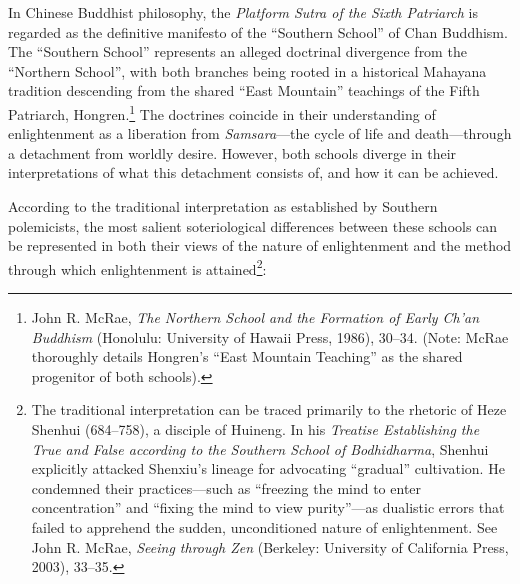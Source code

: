 In Chinese Buddhist philosophy, the \emph{Platform Sutra of the Sixth Patriarch} is regarded as the definitive manifesto of the ``Southern
School'' of Chan Buddhism. The ``Southern School'' represents an alleged
doctrinal divergence from the ``Northern School'', with both branches
being rooted in a historical Mahayana tradition descending from the
shared ``East Mountain'' teachings of the Fifth Patriarch, Hongren.\footnote{John R. McRae, \emph{The Northern School and the
  Formation of Early Ch'an Buddhism} (Honolulu: University of Hawaii
  Press, 1986), 30--34. (Note: McRae thoroughly details Hongren's ``East
  Mountain Teaching'' as the shared progenitor of both schools).} The doctrines coincide in their understanding of enlightenment as a
liberation from \emph{Samsara}---the cycle of life and death---through a detachment from worldly desire. However, both schools diverge in their
interpretations of what this detachment consists of, and how it can be achieved.

According to the traditional interpretation as established by Southern
polemicists, the most salient soteriological differences between these
schools can be represented in both their views of the nature of
enlightenment and the method through which enlightenment is
attained\footnote{The traditional interpretation can be traced primarily
  to the rhetoric of Heze Shenhui (684--758), a disciple of Huineng. In
  his \emph{Treatise Establishing the True and False according to the
  Southern School of Bodhidharma}, Shenhui explicitly attacked Shenxiu's
  lineage for advocating ``gradual'' cultivation. He condemned their
  practices---such as ``freezing the mind to enter concentration'' and
``fixing the mind to view purity''---as dualistic errors that failed to
  apprehend the sudden, unconditioned nature of enlightenment. See John
  R. McRae, \emph{Seeing through Zen} (Berkeley: University of
  California Press, 2003), 33--35.}:

